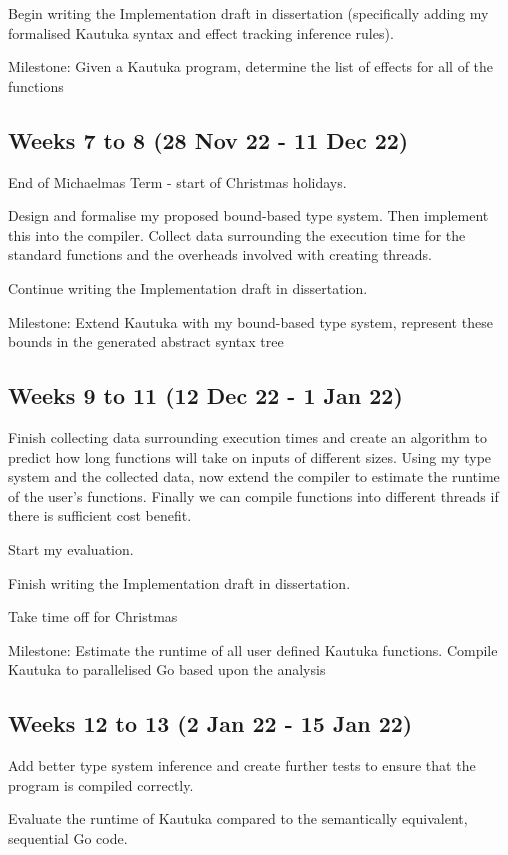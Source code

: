 \documentclass[12pt,a4paper,twoside]{article}
\begin{document}
Begin writing the Implementation draft in dissertation (specifically adding my formalised Kautuka syntax and effect tracking inference rules).

Milestone: Given a Kautuka program, determine the list of effects for all of the functions 

\subsection*{Weeks 7 to 8 (28 Nov 22 - 11 Dec 22)}
End of Michaelmas Term - start of Christmas holidays.

Design and formalise my proposed bound-based type system. Then implement this into the compiler. Collect data surrounding the execution time for the standard functions and the overheads involved with creating threads.

Continue writing the Implementation draft in dissertation.

Milestone: Extend Kautuka with my bound-based type system, represent these bounds in the generated abstract syntax tree 

\subsection*{Weeks 9 to 11 (12 Dec 22 - 1 Jan 22)}

Finish collecting data surrounding execution times and create an algorithm to predict how long functions will take on inputs of different sizes. Using my type system and the collected data, now extend the compiler to estimate the runtime of the user's functions. Finally we can compile functions into different threads if there is sufficient cost benefit.

Start my evaluation.

Finish writing the Implementation draft in dissertation.

Take time off for Christmas

Milestone: Estimate the runtime of all user defined Kautuka functions. Compile Kautuka to parallelised Go based upon the analysis 

\subsection*{Weeks 12 to 13 (2 Jan 22 - 15 Jan 22)}

Add better type system inference and create further tests to ensure that the program is compiled correctly. 

Evaluate the runtime of Kautuka compared to the semantically equivalent, sequential Go code.
\end{document}
